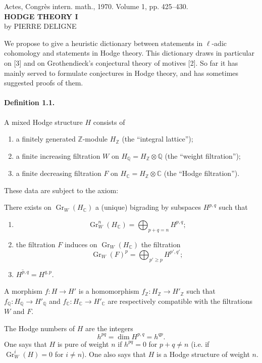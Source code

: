 \documentclass[10pt]{article}
\newcommand{\C}{\mathbb C}
\newcommand{\Q}{\mathbb Q}
\newcommand{\Z}{\mathbb Z}
\newcommand{\Gr}{\operatorname{Gr}}
\begin{document}
\begin{center}
{\small Actes, Congrès intern. math., 1970. Volume 1, pp. 425--430.}\\[4em]
{\Large\bfseries HODGE THEORY I}\\[1.6em]
{\large by PIERRE DELIGNE}
\end{center}

We propose to give a heuristic dictionary between statements in $\ell$-adic cohomology and statements in Hodge theory. This dictionary draws in particular on [3] and on Grothendieck's conjectural theory of motives [2]. So far it has mainly served to formulate conjectures in Hodge theory, and has sometimes suggested proofs of them.

\paragraph{Definition 1.1.} A mixed Hodge structure $H$ consists of
\begin{enumerate}[label=(\alph*)]
\item a finitely generated $\Z$-module $H_\Z$ (the ``integral lattice'');
\item a finite increasing filtration $W$ on $H_\Q=H_\Z\otimes\Q$ (the ``weight filtration'');
\item a finite decreasing filtration $F$ on $H_\C=H_\Z\otimes\C$ (the ``Hodge filtration'').
\end{enumerate}
These data are subject to the axiom:

There exists on $\Gr_W(H_\C)$ a (unique) bigrading by subspaces $H^{p,q}$ such that
\begin{enumerate}[label=(\roman*)]
\item
\[
\Gr_W^n(H_\C)=\bigoplus_{p+q=n}H^{p,q};
\]
\item the filtration $F$ induces on $\Gr_W(H_\C)$ the filtration
\[
\Gr_W(F)^p=\bigoplus_{p'\ge p}H^{p',q'};
\]
\item $\overline{H^{p,q}}=H^{q,p}$.
\end{enumerate}
A morphism $f:H\to H'$ is a homomorphism $f_\Z:H_\Z\to H'_\Z$ such that $f_\Q:H_\Q\to H'_\Q$ and $f_\C:H_\C\to H'_\C$ are respectively compatible with the filtrations $W$ and $F$.

The Hodge numbers of $H$ are the integers
\[
\tag{1.2}
h^{pq}=\dim H^{p,q}=h^{qp}.
\]
One says that $H$ is pure of weight $n$ if $h^{pq}=0$ for $p+q\ne n$ (i.e. if $\Gr_W^i(H)=0$ for $i\ne n$). One also says that $H$ is a Hodge structure of weight $n$.
\end{document}
